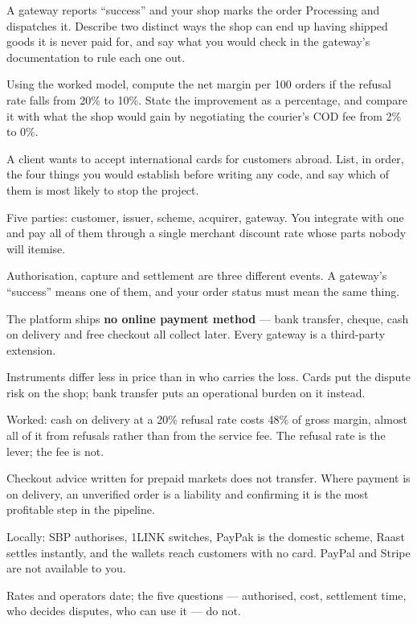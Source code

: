 \begin{checkpoint}
\begin{tightnum}
  \item A gateway reports ``success'' and your shop marks the order Processing
        and dispatches it. Describe two distinct ways the shop can end up
        having shipped goods it is never paid for, and say what you would check
        in the gateway's documentation to rule each one out.
  \item Using the worked model, compute the net margin per 100 orders if the
        refusal rate falls from 20\% to 10\%. State the improvement as a
        percentage, and compare it with what the shop would gain by
        negotiating the courier's COD fee from 2\% to 0\%.
  \item A client wants to accept international cards for customers abroad.
        List, in order, the four things you would establish before writing any
        code, and say which of them is most likely to stop the project.
\end{tightnum}
\end{checkpoint}

\begin{chaptersummary}
\begin{tight}
  \item Five parties: customer, issuer, scheme, acquirer, gateway. You
        integrate with one and pay all of them through a single merchant
        discount rate whose parts nobody will itemise.
  \item Authorisation, capture and settlement are three different events. A
        gateway's ``success'' means one of them, and your order status must
        mean the same thing.
  \item The platform ships \textbf{no online payment method} --- bank transfer,
        cheque, cash on delivery and free checkout all collect later. Every
        gateway is a third-party extension.
  \item Instruments differ less in price than in who carries the loss. Cards
        put the dispute risk on the shop; bank transfer puts an operational
        burden on it instead.
  \item Worked: cash on delivery at a 20\% refusal rate costs 48\% of gross
        margin, almost all of it from refusals rather than from the service
        fee. The refusal rate is the lever; the fee is not.
  \item Checkout advice written for prepaid markets does not transfer. Where
        payment is on delivery, an unverified order is a liability and
        confirming it is the most profitable step in the pipeline.
  \item Locally: SBP authorises, 1LINK switches, PayPak is the domestic
        scheme, Raast settles instantly, and the wallets reach customers with
        no card. PayPal and Stripe are not available to you.
  \item Rates and operators date; the five questions --- authorised, cost,
        settlement time, who decides disputes, who can use it --- do not.
\end{tight}
\end{chaptersummary}

